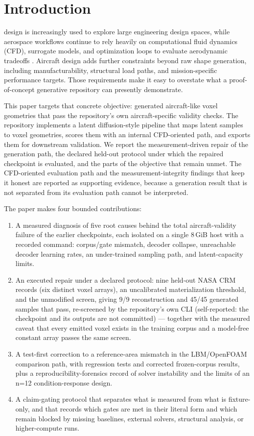 \section{Introduction}
\label{sec:introduction}
 design is increasingly used to explore large engineering design spaces, while aerospace workflows continue to rely heavily on computational fluid dynamics (CFD), surrogate models, and optimization loops to evaluate aerodynamic tradeoffs \cite{elham2021openfemflow, andres2021surrogate_aero}. Aircraft design adds further constraints beyond raw shape generation, including manufacturability, structural load paths, and mission-specific performance targets. Those requirements make it easy to overstate what a proof-of-concept generative repository can presently demonstrate.

This paper targets that concrete objective: generated aircraft-like voxel geometries that pass the repository's own aircraft-specific validity checks. The repository implements a latent diffusion-style pipeline that maps latent samples to voxel geometries, scores them with an internal CFD-oriented path, and exports them for downstream validation. We report the measurement-driven repair of the generation path, the declared held-out protocol under which the repaired checkpoint is evaluated, and the parts of the objective that remain unmet. The CFD-oriented evaluation path and the measurement-integrity findings that keep it honest are reported as supporting evidence, because a generation result that is not separated from its evaluation path cannot be interpreted.

The paper makes four bounded contributions:
\begin{enumerate}
    \item A measured diagnosis of five root causes behind the total aircraft-validity failure of the earlier checkpoints, each isolated on a single 8\,GiB host with a recorded command: corpus/gate mismatch, decoder collapse, unreachable decoder learning rates, an under-trained sampling path, and latent-capacity limits.
    \item An executed repair under a declared protocol: nine held-out NASA CRM records (six distinct voxel arrays), an uncalibrated materialization threshold, and the unmodified screen, giving 9/9 reconstruction and 45/45 generated samples that pass, re-screened by the repository's own CLI (self-reported: the checkpoint and its outputs are not committed) — together with the measured caveat that every emitted voxel exists in the training corpus and a model-free constant array passes the same screen.
    \item A test-first correction to a reference-area mismatch in the LBM/OpenFOAM comparison path, with regression tests and corrected frozen-corpus results, plus a reproducibility-forensics record of solver instability and the limits of an n=12 condition-response design.
    \item A claim-gating protocol that separates what is measured from what is fixture-only, and that records which gates are met in their literal form and which remain blocked by missing baselines, external solvers, structural analysis, or higher-compute runs.
\end{enumerate}

